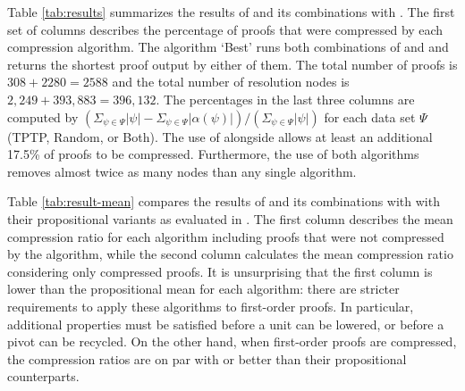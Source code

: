 {Table \ref{tab:results} summarizes the results of {\FORPI} and its combinations with {\GFOLU}. The first set of columns describes the percentage of proofs that were compressed by each compression algorithm. The algorithm `Best' runs both combinations of {\GFOLU} and {\FORPI} and returns the shortest proof output by either of them. The total number of proofs is $308+2280=2588$ and the total number of resolution nodes is $2,249 + 393,883
= 396,132$. The percentages in the last three columns are computed by $(\Sigma_{\psi \in \Psi} |\psi|  - \Sigma_{\psi\in \Psi} |\alpha(\psi)|)/(\Sigma_{\psi \in \Psi} |\psi|)$ for each data set $\Psi$ (TPTP, Random, or Both). The use of {\FORPI} alongside {\GFOLU} allows at least an additional 17.5\% of proofs to be compressed. Furthermore, the use of both algorithms removes almost twice as many nodes than any single algorithm.

Table \ref{tab:result-mean} compares the results of {\FORPI} and its combinations with {\GFOLU} with their propositional variants as evaluated in  \cite{Boudou}. The first column describes the mean compression ratio for each algorithm including proofs that were not compressed by the algorithm, while the second column calculates the mean compression ratio considering only compressed proofs. It is unsurprising that the first column is lower than the propositional mean for each algorithm: there are stricter requirements to apply these algorithms to first-order proofs. In particular, additional properties must be satisfied before a unit can be lowered, or before a pivot can be recycled. On the other hand, when first-order proofs are compressed, the compression ratios are on par with or better than their propositional counterparts.

\begin{figure}[p]
    

\end{figure}}
